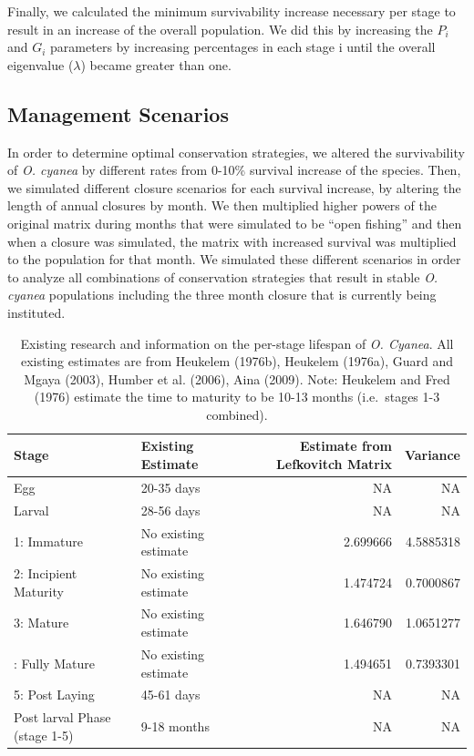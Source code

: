 \documentclass[
]{article}
\begin{document}
Finally, we calculated the minimum survivability increase necessary per stage to result in an increase of the overall population. We did this by increasing the \(P_i\) and \(G_i\) parameters by increasing percentages in each stage i until the overall eigenvalue (\(\lambda\)) became greater than one.

\hypertarget{management-scenarios}{%
\subsection{Management Scenarios}\label{management-scenarios}}

In order to determine optimal conservation strategies, we altered the survivability of \emph{O. cyanea} by different rates from 0-10\% survival increase of the species. Then, we simulated different closure scenarios for each survival increase, by altering the length of annual closures by month. We then multiplied higher powers of the original matrix during months that were simulated to be ``open fishing'' and then when a closure was simulated, the matrix with increased survival was multiplied to the population for that month. We simulated these different scenarios in order to analyze all combinations of conservation strategies that result in stable \emph{O. cyanea} populations including the three month closure that is currently being instituted.

\begin{table}

\caption{\label{tab:LifeHistory}Existing research and information on the per-stage lifespan of \emph{O. Cyanea}. All existing estimates are from Heukelem (1976b), Heukelem (1976a), Guard and Mgaya (2003), Humber et al. (2006), Aina (2009). Note: Heukelem and Fred (1976) estimate the time to maturity to be 10-13 months (i.e.~stages 1-3 combined). \label{LifeHistory}}
\centering
\begin{tabular}[t]{llrr}
\toprule
Stage & Existing Estimate & Estimate from Lefkovitch Matrix & Variance\\
\midrule
Egg & 20-35 days & NA & NA\\
Larval & 28-56 days & NA & NA\\
1: Immature & No existing estimate & 2.699666 & 4.5885318\\
2: Incipient Maturity & No existing estimate & 1.474724 & 0.7000867\\
3: Mature & No existing estimate & 1.646790 & 1.0651277\\
\addlinespace
4: Fully Mature & No existing estimate & 1.494651 & 0.7393301\\
5: Post Laying & 45-61 days & NA & NA\\
Post larval Phase (stage 1-5) & 9-18 months & NA & NA\\
\bottomrule
\end{tabular}
\end{table}
\end{document}
